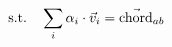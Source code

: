 \documentclass[preview]{standalone}
\begin{document}
\begin{align*}
\special{dvisvgm:raw <g id='unique000'>}\text{s.t.} \quad \sum_i \alpha_i \cdot \vec{v}_i = \vec{\text{chord}}_{ab}\special{dvisvgm:raw </g>}
\end{align*}
\end{document}

